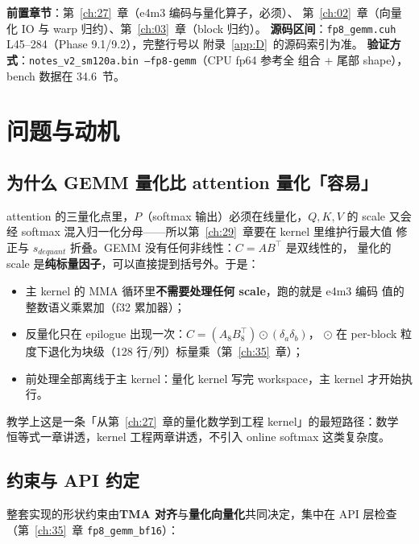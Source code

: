 \textbf{前置章节}：第~\ref{ch:27}~章（e4m3 编码与量化算子，必须）、
第~\ref{ch:02}~章（向量化 IO 与 warp 归约）、第~\ref{ch:03}~章（block 归约）。
\textbf{源码区间}：\texttt{fp8\_gemm.cuh} L45--284（Phase 9.1/9.2），完整行号以
附录~\ref{app:D}~的源码索引为准。
\textbf{验证方式}：\texttt{notes\_v2\_sm120a.bin --fp8-gemm}（CPU fp64 参考全
组合 + 尾部 shape），bench 数据在 34.6~节。

\section{问题与动机}

\subsection{为什么 GEMM 量化比 attention 量化「容易」}

attention 的三量化点里，$P$（softmax 输出）必须在线量化，$Q,K,V$ 的 scale 又会
经 softmax 混入归一化分母——所以第~\ref{ch:29}~章要在 kernel 里维护行最大值
修正与 $s_{dequant}$ 折叠。GEMM 没有任何非线性：$C=AB^{\top}$ 是双线性的，
量化的 scale 是\textbf{纯标量因子}，可以直接提到括号外。于是：

\begin{itemize}[itemsep=1pt,topsep=2pt]
  \item 主 kernel 的 MMA 循环里\textbf{不需要处理任何 scale}，跑的就是 e4m3 编码
        值的整数语义乘累加（f32 累加器）；
  \item 反量化只在 epilogue 出现一次：$C = (A_8 B_8^{\top})\odot(\delta_a\delta_b)$，
        $\odot$ 在 per-block 粒度下退化为块级（128 行/列）标量乘（第~\ref{ch:35}~章）；
  \item 前处理全部离线于主 kernel：量化 kernel 写完 workspace，主 kernel 才开始执行。
\end{itemize}

教学上这是一条「从第~\ref{ch:27}~章的量化数学到工程 kernel」的最短路径：数学
恒等式一章讲透，kernel 工程两章讲透，不引入 online softmax 这类复杂度。

\subsection{约束与 API 约定}

整套实现的形状约束由\textbf{TMA 对齐}与\textbf{量化向量化}共同决定，集中在 API
层检查（第~\ref{ch:35}~章 \texttt{fp8\_gemm\_bf16}）：

